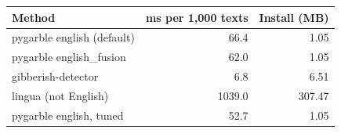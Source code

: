 \begin{tabular}{lrr}
\toprule
Method & ms per 1,000 texts & Install (MB) \\
\midrule
pygarble english (default) & 66.4 & 1.05 \\
pygarble english\_fusion & 62.0 & 1.05 \\
gibberish-detector & 6.8 & 6.51 \\
lingua (not English) & 1039.0 & 307.47 \\
\midrule
pygarble english, tuned & 52.7 & 1.05 \\
\bottomrule
\end{tabular}
